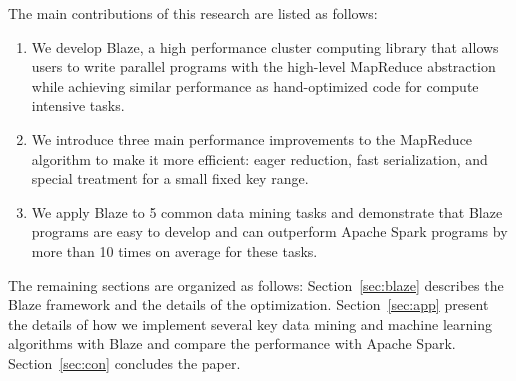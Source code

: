 The main contributions of this research are listed as follows:
\begin{enumerate}
    \item We develop Blaze, a high performance cluster computing library that allows users to write parallel programs with the high-level MapReduce abstraction while achieving similar performance as hand-optimized code for compute intensive tasks.
    \item We introduce three main performance improvements to the MapReduce algorithm to make it more efficient: eager reduction, fast serialization, and special treatment for a small fixed key range.
    \item We apply Blaze to 5 common data mining tasks and demonstrate that Blaze programs are easy to develop and can outperform Apache Spark programs by more than 10 times on average for these tasks.
\end{enumerate}

The remaining sections are organized as follows:
Section~\ref{sec:blaze} describes the Blaze framework and the details of the optimization.
Section~\ref{sec:app} present the details of how we implement several key data mining and machine learning algorithms with Blaze and compare the performance with Apache Spark.
Section~\ref{sec:con} concludes the paper.


